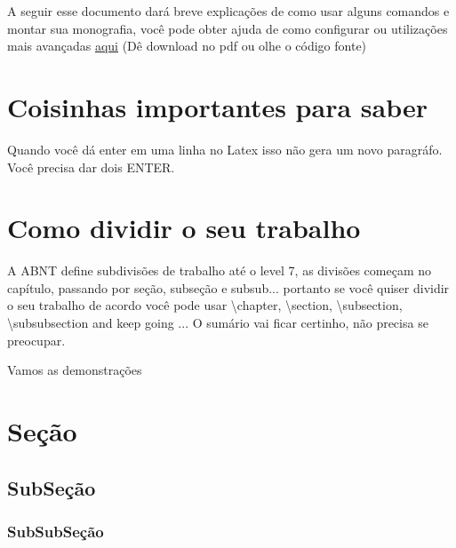 A seguir esse documento dará breve explicações de como usar alguns comandos e montar sua monografia,
 você pode obter ajuda de como configurar ou utilizações mais avançadas 
 \href{http://ctan.sharelatex.com/tex-archive/macros/latex/contrib/abntex2/doc/abntex2.pdf}{aqui} 
 (Dê download no pdf ou olhe o código fonte)

\section{Coisinhas importantes para saber}
	Quando você dá enter em uma linha no Latex isso não gera um novo paragráfo. Você precisa dar
	dois ENTER. 

\section{Como dividir o seu trabalho}
	A ABNT define subdivisões de trabalho até o level 7, as divisões começam no capítulo, 
	passando por seção, subseção e subsub... portanto se você quiser dividir o seu trabalho de acordo 
	você pode usar \textbackslash chapter, \textbackslash section, \textbackslash subsection, \textbackslash subsubsection 
	and keep going ... O sumário vai ficar certinho, não precisa se preocupar.


	Vamos as demonstrações
\section{Seção}
\subsection{SubSeção}
\subsubsection{SubSubSeção}
